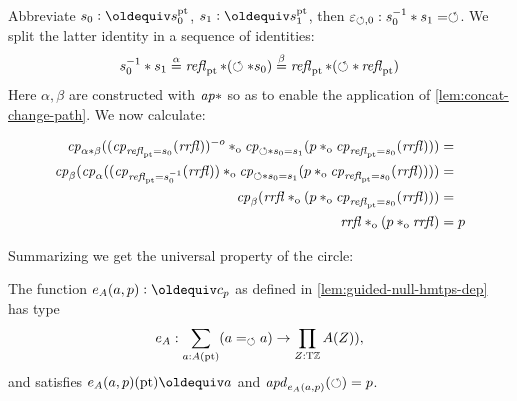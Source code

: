 \documentclass[a4,12pt]{amsart}
\begin{document}
Abbreviate $s_0 \defeq s^\pt_0$, $s_1 \defeq s^\pt_1$, 
then $\varepsilon_{\Zloop,0} : s_0^{-1} \ct s_1 = \Zloop$.
We split the latter identity in a sequence of identities:
\[
s_0^{-1} \ct s_1 \stackrel{\alpha}{=} 
\refl{\pt}\ct(\Zloop\ct s_0) \stackrel{\beta}{=} 
\refl{\pt}\ct(\Zloop\ct\refl{\pt}) 
\]
Here $\alpha,\beta$ are constructed with $\apc$ so as to
enable the application of \cref{lem:concat-change-path}.
We now calculate:

\begin{align*}
\cp{\alpha\ct\beta}
((\cp{\refl{\pt} = s_0}(\rrfl))^{-o} \cto
   \cp{\Zloop\ct s_0 = s_1}(p\cto\cp{\refl{\pt} = s_0}(\rrfl)))&= \\
\cp{\beta}(\cp{\alpha}
((\cp{\refl{\pt} = s_0^{-1}}(\rrfl)) \cto
   \cp{\Zloop\ct s_0 = s_1}(p\cto\cp{\refl{\pt} = s_0}(\rrfl))))&= \\
\cp{\beta}
(\rrfl \cto
   (p\cto\cp{\refl{\pt} = s_0}(\rrfl)))&= \\
\rrfl\cto(p\cto\rrfl)&=p\\
\end{align*}

Summarizing we get the universal property of the circle:

\begin{definition}\label{def:TorZelim}
The function $e_A(a,p) \defeq c_p$ as defined in 
\cref{lem:guided-null-hmtps-dep} has type
\[
e_A : \sum_{a:A(\pt)}(a=_\Zloop a) \to \prod_{Z:\TorZ} A(Z)),
\]
and satisfies $e_A(a,p)(\pt) \jdeq a$ and 
$\apd{e_A(a,p)}(\Zloop) = p$.
\end{definition}






\end{document}
